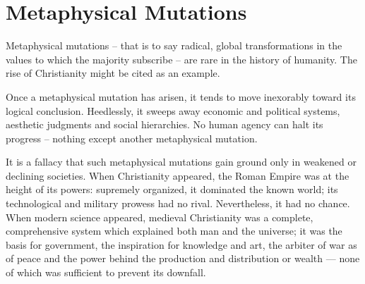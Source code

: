 \section{Metaphysical Mutations}

\begin{quotationx}
Metaphysical mutations -- that is to say radical, global transformations in the values to which the majority subscribe -- are rare in the history of humanity. The rise of Christianity might be cited as an example.

Once a metaphysical mutation has arisen, it tends to move inexorably toward its logical conclusion. Heedlessly, it sweeps away economic and political systems, aesthetic judgments and social hierarchies. No human agency can halt its progress -- nothing except another metaphysical mutation.

It is a fallacy that such metaphysical mutations gain ground only in weakened or declining societies. When Christianity appeared, the Roman Empire was at the height of its powers: supremely organized, it dominated the known world; its technological and military prowess had no rival. Nevertheless, it had no chance. When modern science appeared, medieval Christianity was a complete, comprehensive system which explained both man and the universe; it was the basis for government, the inspiration for knowledge and art, the arbiter of war as of peace and the power behind the production and distribution or wealth --- none of which was sufficient to prevent its downfall.


\end{quotationx}




